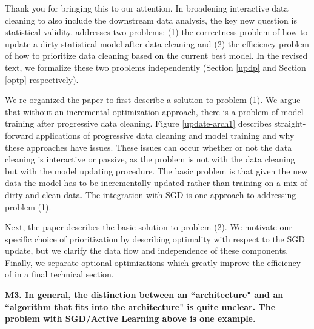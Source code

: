 
Thank you for bringing this to our attention. 
In broadening interactive data cleaning to also include the downstream data analysis, the key new question is statistical validity.
\sys addresses two problems: (1) the correctness problem of how to update a dirty statistical model after data cleaning and (2) the efficiency problem of how to prioritize data cleaning based on the current best model.
In the revised text, we formalize these two problems independently (Section \ref{updp} and Section \ref{optp} respectively). 

We re-organized the paper to first describe a solution to problem (1). We argue that without an incremental optimization approach, there is a problem of model training after progressive data cleaning. Figure \ref{update-arch1} describes straight-forward applications of progressive data cleaning and model training and why these approaches have issues.
These issues can occur whether or not the data cleaning is interactive or passive, as the problem is not with the data cleaning but with the model updating procedure.
The basic problem is that given the new data the model has to be incrementally updated rather than training on a mix of dirty and clean data.
The integration with SGD is one approach to addressing problem (1).

Next, the paper describes the basic solution to problem (2). We motivate our specific choice of prioritization by describing optimality with respect to the SGD update, but we clarify the data flow and independence of these components. 
Finally, we separate optional optimizations which greatly improve the efficiency of \sys in a final technical section.

\vspace{0.5em}

\noindent\textbf{M3. In general, the distinction between an ``architecture" and an ``algorithm that fits into the architecture" is quite unclear. The problem with SGD/Active Learning above is one example.}

